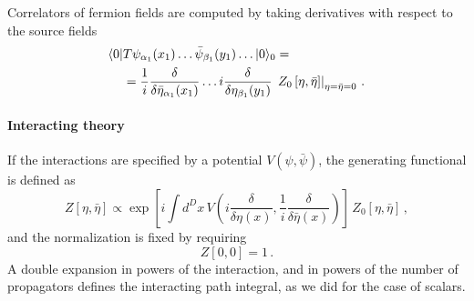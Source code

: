 \documentclass[notes]{subfiles}
\renewcommand{\psibar}{\bar{\psi}}
\renewcommand{\etabar}{\bar{\eta}}
\begin{document}
Correlators of fermion fields are computed by taking derivatives with
respect to the source fields
\begin{align}
  \bra{ 0}& T \psi_{\alpha_1}(x_1) \ldots \psibar_{\beta_1}(y_1)
  \ldots |0\rangle_0  = \nonumber \\
   &=\frac{1}{i} \frac{\delta}{\delta\etabar_{\alpha_1}(x_1)} \ldots
  i \frac{\delta}{\delta\eta_{\beta_1}(y_1)}\, 
  \left. Z_0\left[\eta, \etabar\right] \right|_{\eta=\etabar=0}\, .
\end{align}

\paragraph{Interacting theory}

If the interactions are specified by a potential
$V\left(\psi,\psibar\right)$, the generating functional is defined as 
\begin{equation}
  \label{eq:InterGenFunc}
  Z\left[\eta,\etabar\right] \propto
  \exp\left[
    i \int d^Dx\, V\left( i \frac{\delta}{\delta\eta(x)}, 
    \frac{1}{i} \frac{\delta}{\delta\etabar(x)}\right)
  \right] \, 
  Z_0\left[\eta, \etabar \right]\, , 
\end{equation}
and the normalization is fixed by requiring
\begin{equation}
  \label{eq:ZNorm}
  Z[0,0] = 1\, .
\end{equation}
A double expansion in powers of the interaction, and in powers of the
number of propagators defines the interacting path integral, as we did
for the case of scalars. 
\end{document}
